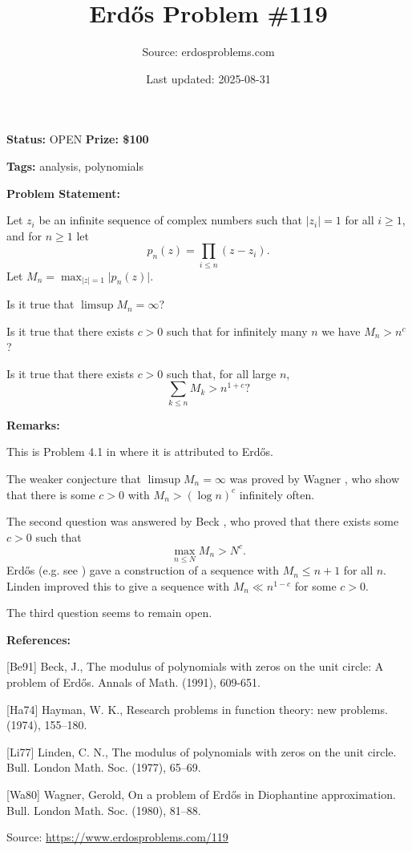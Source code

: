 \documentclass{article}
\title{Erd\H{o}s Problem \#119}
\date{Last updated: 2025-08-31}
\author{Source: erdosproblems.com}
\begin{document}
\maketitle

\noindent\textbf{Status:} OPEN \quad \textbf{Prize: \$100}

\noindent\textbf{Tags:} analysis, polynomials

\medskip
\noindent\textbf{Problem Statement:}

Let $z_i$ be an infinite sequence of complex numbers such that $\lvert z_i\rvert=1$ for all $i\geq 1$, and for $n\geq 1$ let\[p_n(z)=\prod_{i\leq n} (z-z_i).\]Let $M_n=\max_{\lvert z\rvert=1}\lvert p_n(z)\rvert$. 

Is it true that $\limsup M_n=\infty$?

Is it true that there exists $c>0$ such that for infinitely many $n$ we have $M_n > n^c$?

Is it true that there exists $c>0$ such that, for all large $n$,\[\sum_{k\leq n}M_k > n^{1+c}?\]

\bigskip
\noindent\textbf{Remarks:}

This is Problem 4.1 in \cite{Ha74} where it is attributed to Erd\H{o}s.

The weaker conjecture that $\limsup M_n=\infty$ was proved by Wagner \cite{Wa80}, who show that there is some $c>0$ with $M_n>(\log n)^c$ infinitely often.

The second question was answered by Beck \cite{Be91}, who proved that there exists some $c>0$ such that\[\max_{n\leq N} M_n > N^c.\]Erd\H{o}s (e.g. see \cite{Ha74}) gave a construction of a sequence with $M_n\leq n+1$ for all $n$. Linden \cite{Li77} improved this to give a sequence with $M_n\ll n^{1-c}$ for some $c>0$.

The third question seems to remain open.

\bigskip
\noindent\textbf{References:}

[Be91] Beck, J., The modulus of polynomials with zeros on the unit circle: A problem of Erd\H{o}s. Annals of Math. (1991), 609-651.
 
 [Ha74] Hayman, W. K., Research problems in function theory: new problems. (1974), 155--180.
 
 [Li77] Linden, C. N., The modulus of polynomials with zeros on the unit circle. Bull. London Math. Soc. (1977), 65--69.
 
 [Wa80] Wagner, Gerold, On a problem of {E}rd\H{o}s in {D}iophantine approximation. Bull. London Math. Soc. (1980), 81--88.

\bigskip
\noindent\small{Source: \url{https://www.erdosproblems.com/119}}
\end{document}
